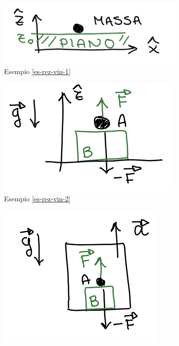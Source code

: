 \begin{figure}[h!]
    \vspace{-10pt}
    \centering
    \begin{subfigure}[b]{0.33\textwidth}
        \centering
        \includegraphics[width=\textwidth]{images/esempio-reazioni-vincolari-1.png}
        \caption*{Esempio \ref{es-rez-vin-1}}
    \end{subfigure}
    \begin{subfigure}[b]{0.33\textwidth}
        \centering
        \includegraphics[width=\textwidth]{images/esempio-reazioni-vincolari-2.png}
        \caption*{Esempio \ref{es-rez-vin-2}}
    \end{subfigure}
    \begin{subfigure}[b]{0.25\textwidth}
        \centering
        \includegraphics[width=\textwidth]{images/esempio-reazioni-vincolari-3.png}

\end{subfigure}
\end{figure}
